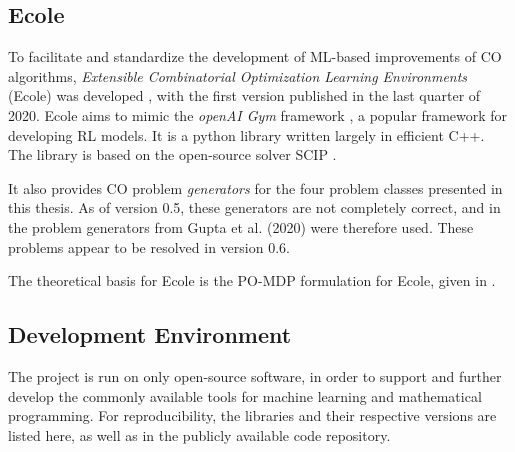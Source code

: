 \subsection{Ecole}\label{ssec:ecole}

To facilitate and standardize the development of \gls{ML}-based improvements of \gls{CO} algorithms, \textit{Extensible Combinatorial Optimization Learning Environments} (\gls{Ecole}) was developed \cite{prouvost2020ecole}, with the first version published in the last quarter of 2020. \gls{Ecole} aims to mimic the \textit{openAI Gym} framework \cite{brockman2016openai}, a popular framework for developing \gls{RL} models. It is a python library written largely in efficient C++. 
The library is based on the open-source solver \gls{SCIP} \cite{achterberg2009scip}.


It also provides \gls{CO} problem \textit{generators} for the four problem classes presented in this thesis. As of version 0.5, these generators are not completely correct, and in the problem generators from Gupta et al. (2020) \cite{gupta2020hybrid} were therefore used. These problems appear to be resolved in version 0.6.  


The theoretical basis for \gls{Ecole} is the \gls{PO-MDP} formulation for \gls{Ecole}, given in .





\subsection{Development Environment}

The project is run on only open-source software, in order to support and further develop the commonly available tools for machine learning and mathematical programming. For reproducibility, the libraries and their respective versions are listed here, as well as in the publicly available code repository. 

